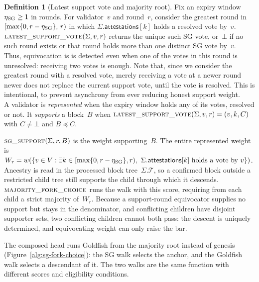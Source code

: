 \documentclass{article}
\theoremstyle{plain}
\theoremstyle{definition}
\newtheorem{definition}{Definition}
\theoremstyle{remark}
\newcommand{\T}{\mathcal T}
\newcommand{\attestations}{\mathsf{attestations}}
\begin{document}
\begin{definition}[Latest support vote and majority root]
\label{def:majority-fork-choice}
Fix an expiry window $\eta_{\rm SG}\geq1$ in rounds.  For validator~$v$ and
round~$r$, consider the greatest round in
$[\max\{0,r-\eta_{\rm SG}\},\,r)$ in which $\Sigma.\attestations[k]$ holds a resolved
vote by~$v$.  $\Call{latest\_support\_vote}{\Sigma,v,r}$ returns the unique
such SG vote, or~$\bot$ if no such round exists or that
round holds more than one distinct SG vote by~$v$.  Thus, equivocation is
is detected even when one of the votes in this round is
unresolved: receiving two votes is enough. Note that, since we consider the greatest round with a resolved vote, merely receiving a vote at a newer round newer does not replace the current support vote, until the vote is resolved. This is intentional, to prevent asynchrony from ever reducing honest support weight.
\\
A validator is \emph{represented} when the expiry window holds any of its
votes, resolved or not.  It \emph{supports} a block~$B$ when
$\Call{latest\_support\_vote}{\Sigma,v,r}=(v,k,C)$ with $C\neq\bot$ and
$B\preceq C$.

$\Call{sg\_support}{\Sigma,r,B}$ is the weight supporting~$B$.
The entire represented weight is
$W_r=w(\{v\in V:\exists k\in[\max\{0,r-\eta_{\rm SG}\},r),\
  \Sigma.\attestations[k]\text{ holds a vote by }v\})$.
Ancestry is read in the processed block tree~$\Sigma.\T$, so a confirmed block outside a restricted child
tree still supports the child through which it descends.
$\Call{majority\_fork\_choice}{}$ runs the walk with this score, requiring
from each child a strict majority of~$W_r$.  Because a support-round
equivocator supplies no support but stays in the denominator, and
conflicting children have disjoint supporter
sets, two conflicting children cannot both pass: the descent is uniquely
determined, and equivocating weight can only raise the bar.
\end{definition}

The composed head runs Goldfish from the majority root instead of genesis
(Figure~\ref{alg:sg-fork-choice}): the SG walk selects the anchor, and the
Goldfish walk selects a descendant of it.  The two walks are the same
function with different scores and eligibility conditions.
\end{document}
